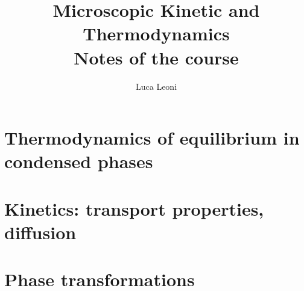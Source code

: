 \documentclass[12pt]{report}
\title{\Huge{Microscopic Kinetic and Thermodynamics}\\Notes of the course}
\author{\huge{Luca Leoni}}
\date{}
\begin{document}
    \maketitle

    \tableofcontents

    \chapter{Thermodynamics of equilibrium in condensed phases}
    
    
    
    

    \chapter{Kinetics: transport properties, diffusion}
    
    
    
    

    \chapter{Phase transformations}
    
\end{document}
